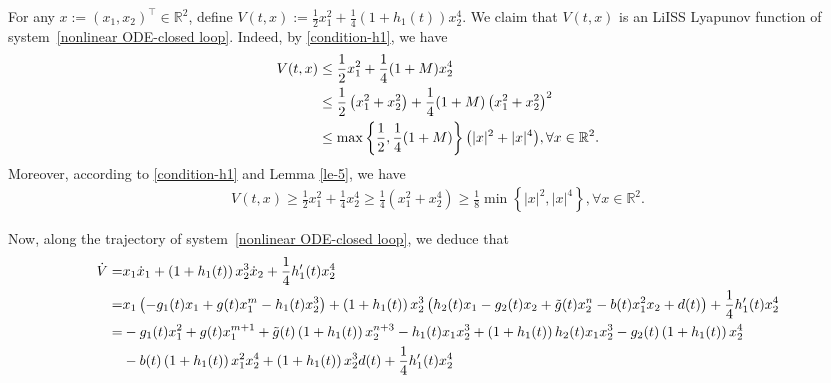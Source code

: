 \documentclass[onecolumn]{autart}
\newenvironment{proof of Prop.ODE}{{\it Proof of Proposition~\ref{Prop.ODE}:\enspace}}{\hfill $\blacksquare$\par}
\newenvironment{proof of PDE}{{\it Proof of Proposition \ref{Prop.8}:\enspace}}{\hfill $\blacksquare$\par}
\begin{document}
{\begin{proof of Prop.ODE}
For any $x:=(x_1,x_2)^{\top}\in \mathbb{R}^2$, define $V(t,x):=\frac{1}{2}x_1^2+\frac{1}{4}(1+h_1(t))x_2^4$. We claim that $V(t,x)$ is  an LiISS Lyapunov function of system~\eqref{nonlinear ODE-closed loop}.
Indeed, by \eqref{condition-h1},  we have
\begin{align}\label{s-e-v}
	V(t,x)&\leq   \frac{1}{2}x_1^2+\frac{1}{4}(1+M)x_2^4\notag\\
	&\leq  \frac{1}{2}\left(x_1^2+x_2^2\right)+\frac{1}{4}(1+M)\left(x_1^2+x_2^2\right)^2\notag\\
	&\leq \max\left\{ \frac{1}{2},\frac{1}{4}(1+M)\right\}{\left(|x|^2+|x|^4\right)},\forall x\in \mathbb{R}^2.
\end{align}
Moreover, according to \eqref{condition-h1} and Lemma \ref{le-5}, we have
\begin{align*}
V(t,x)\geq\frac{1}{2}x_1^2+\frac{1}{4} x_2^4\geq \frac{1}{4}\left(x_1^2+x_2^4\right) \geq  \frac{1}{8}\min {\left\{|x|^2, |x|^4\right\}},\forall x\in \mathbb{R}^2.
\end{align*}

Now, along the trajectory of system~\eqref{nonlinear ODE-closed loop}, we deduce that
\begin{align}\label{eqq}
\dot{V}= & x_1 \dot{x}_1+\left(1+h_1(t)\right) x_2^3 \dot{x}_2+\frac{1}{4} h_1^{\prime}(t) x_2^4 \notag\\
= & x_1\left(-g_1(t) x_1+g(t) x_1^m-h_1(t) x_2^3\right)  +\left(1+h_1(t)\right) x_2^3\left(h_2(t) x_1-g_2(t) x_2+{\tilde{g}(t)x^n_2}-b(t) x_1^2 x_2+d(t)\right)  +\frac{1}{4} h_1^{\prime}(t) x_2^4 \notag\\
= & -g_1(t) x_1^2+g(t) x_1^{m+1}+{\tilde{g}(t)\left(1+h_1(t)\right) x_2^{n+3}}-h_1(t) x_1 x_2^3+\left(1+h_1(t)\right) h_2(t) x_1 x_2^3  -g_2(t)\left(1+h_1(t)\right) x_2^4 \notag\\
&-b(t)\left(1+h_1(t)\right) x_1^2 x_2^4+\left(1+h_1(t)\right) x_2^3 d(t)+\frac{1}{4} h^\prime_1(t) x_2^4
\end{align}



\end{proof of Prop.ODE}}
\end{document}
